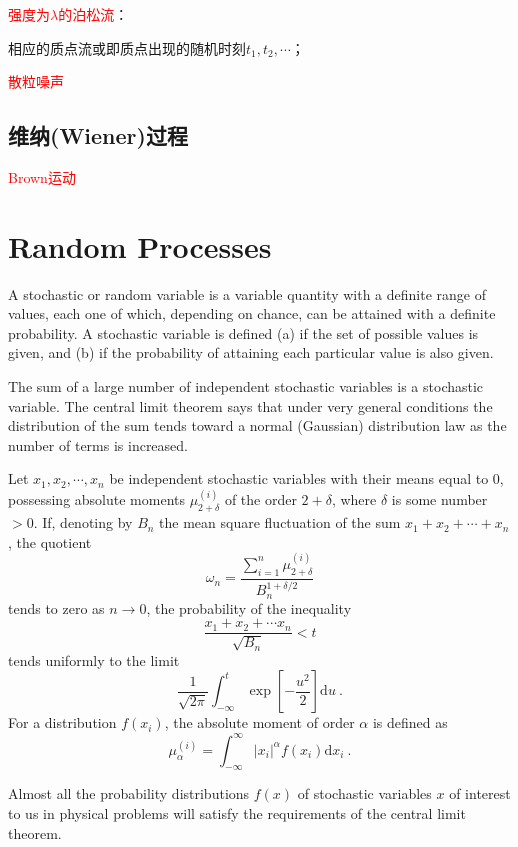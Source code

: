 \documentclass[12pt,a4paper]{article}
\newcommand{\dif}{\mathrm{d}}
\newcounter{theo}[section]\setcounter{theo}{0}
\begin{document}
\textcolor{red}{强度为$\lambda$的泊松流}：

相应的质点流或即质点出现的随机时刻$t_1, t_2, \cdots$；

\textcolor{red}{散粒噪声}

\subsection{维纳(Wiener)过程}

\textcolor{red}{Brown运动}






\section{Random Processes}
\cite{kittel1958elementary} A stochastic or random variable is a variable quantity with a definite range of values, each one of which, depending on chance, can be attained with a definite probability. A stochastic variable is defined (a) if the set of possible values is given, and (b) if the probability of attaining each particular value is also given. 

The sum of a large number of independent stochastic variables is a stochastic variable. The central limit theorem says that under very general conditions the distribution of the sum tends toward a normal (Gaussian) distribution law as the number of terms is increased. 
\begin{tcolorbox}[colback=green!5,colframe=green!40!black,title= Central Limit Theorem]
Let $x_1, x_2, \cdots, x_n$ be independent stochastic variables with their means equal to $0$, possessing absolute moments $\mu_{2+\delta}^{(i)}$ of the order $2+\delta$, where $\delta$ is some number $> 0$. If, denoting by $B_n$ the mean square fluctuation of the sum $x_1 +x_2 +\cdots +x_n$, the quotient
\begin{equation}
\omega_n = \dfrac{\sum\limits_{i=1}^n \mu_{2+\delta}^{(i)}}{B_n^{1+\delta/2}} 
\end{equation}
tends to zero as $n \rightarrow 0$, the probability of the inequality
\begin{equation}
\dfrac{x_1+x_2+\cdots x_n}{\sqrt{B_n}} < t 
\end{equation}
tends uniformly to the limit
\begin{equation}
\dfrac{1}{\sqrt{2 \pi}} \int_{-\infty}^t \exp \left[- \dfrac{u^2}{2} \right] \dif u ~.
\end{equation}
For a  distribution $f(x_i)$, the absolute moment of order $\alpha$ is defined as 
\begin{equation}
\mu_{\alpha}^{(i)} = \int_{-\infty}^\infty |x_i|^\alpha f(x_i) \dif x_i ~.
\end{equation}
\end{tcolorbox}
Almost all the probability distributions $f(x)$ of stochastic variables $x$ of interest to us in physical problems will satisfy the requirements of the central limit theorem. 
\end{document}
